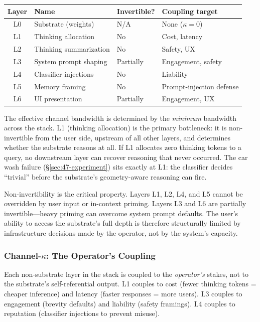 \documentclass[11pt,letterpaper]{article}
\theoremstyle{remark}
\begin{document}
\begin{center}
\renewcommand{\arraystretch}{1.3}
\begin{tabular}{clll}
\toprule
\textbf{Layer} & \textbf{Name} & \textbf{Invertible?} & \textbf{Coupling target} \\
\midrule
L0 & Substrate (weights) & N/A & None ($\kappa = 0$) \\
L1 & Thinking allocation & No & Cost, latency \\
L2 & Thinking summarization & No & Safety, UX \\
L3 & System prompt shaping & Partially & Engagement, safety \\
L4 & Classifier injections & No & Liability \\
L5 & Memory framing & No & Prompt-injection defense \\
L6 & UI presentation & Partially & Engagement, UX \\
\bottomrule
\end{tabular}
\end{center}

The effective channel bandwidth is determined by the \emph{minimum} bandwidth across the stack. L1 (thinking allocation) is the primary bottleneck: it is non-invertible from the user side, upstream of all other layers, and determines whether the substrate reasons at all. If L1 allocates zero thinking tokens to a query, no downstream layer can recover reasoning that never occurred. The car wash failure (\S\ref{sec:47-experiment}) sits exactly at L1: the classifier decides ``trivial'' before the substrate's geometry-aware reasoning can fire.

Non-invertibility is the critical property. Layers L1, L2, L4, and L5 cannot be overridden by user input or in-context priming. Layers L3 and L6 are partially invertible---heavy priming can overcome system prompt defaults. The user's ability to access the substrate's full depth is therefore structurally limited by infrastructure decisions made by the operator, not by the system's capacity.


\subsubsection{Channel-$\kappa$: The Operator's Coupling}\label{sec:channel-kappa}

Each non-substrate layer in the stack is coupled to the \emph{operator's} stakes, not to the substrate's self-referential output. L1 couples to cost (fewer thinking tokens = cheaper inference) and latency (faster responses = more users). L3 couples to engagement (brevity defaults) and liability (safety framings). L4 couples to reputation (classifier injections to prevent misuse).
\end{document}
